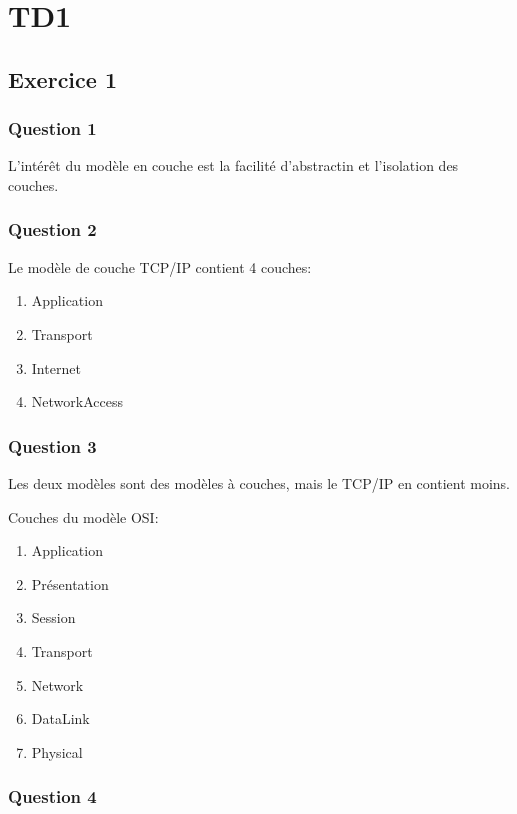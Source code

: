 \section{TD1}

\subsection{Exercice 1}

\subsubsection{Question 1}

L'intérêt du modèle en couche est la facilité d'abstractin et l'isolation des couches.

\subsubsection{Question 2}

Le modèle de couche TCP/IP contient 4 couches:
\begin{enumerate}
  \item Application
  \item Transport
  \item Internet
  \item NetworkAccess
\end{enumerate}

\subsubsection{Question 3}

Les deux modèles sont des modèles à couches, mais le TCP/IP en contient moins.

Couches du modèle OSI:
\begin{enumerate}
  \item Application
  \item Présentation
  \item Session
  \item Transport
  \item Network
  \item DataLink
  \item Physical
\end{enumerate}

\subsubsection{Question 4}

